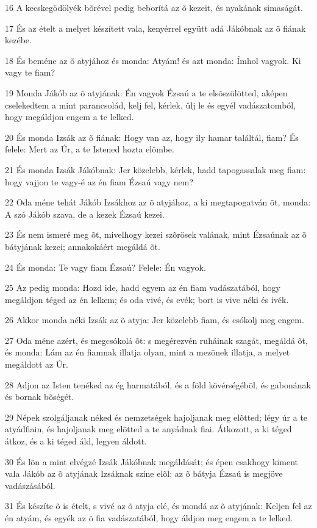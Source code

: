\par 16 A kecskegödölyék bõrével pedig beborítá az õ kezeit, és nyakának simaságát.
\par 17 És az ételt a melyet készített vala, kenyérrel együtt adá Jákóbnak az õ fiának kezébe.
\par 18 És beméne az õ atyjához és monda: Atyám! és azt monda: Ímhol vagyok. Ki vagy te fiam?
\par 19 Monda Jákób az õ atyjának: Én vagyok Ézsaú a te elsõszülötted, aképen cselekedtem a mint parancsolád, kelj fel, kérlek, ûlj le és egyél vadászatomból, hogy megáldjon engem a te lelked.
\par 20 És monda Izsák az õ fiának: Hogy van az, hogy ily hamar találtál, fiam? És felele: Mert az Úr, a te Istened hozta elõmbe.
\par 21 És monda Izsák Jákóbnak: Jer közelebb, kérlek, hadd tapogassalak meg fiam: hogy vajjon te vagy-é az én fiam Ézsaú vagy nem?
\par 22 Oda méne tehát Jákób Izsákhoz az õ atyjához, a ki megtapogatván õt, monda: A szó Jákób szava, de a kezek Ézsaú kezei.
\par 23 És nem ismeré meg õt, mivelhogy kezei szõrösek valának, mint Ézsaúnak az õ bátyjának kezei; annakokáért megáldá õt.
\par 24 És monda: Te vagy fiam Ézsaú? Felele: Én vagyok.
\par 25 Az pedig monda: Hozd ide, hadd egyem az én fiam vadászatából, hogy megáldjon téged az én lelkem; és oda vivé, és evék; bort is vive néki és ivék.
\par 26 Akkor monda néki Izsák az õ atyja: Jer közelebb fiam, és csókolj meg engem.
\par 27 Oda méne azért, és megcsókolá õt: s megérezvén ruháinak szagát, megáldá õt, és monda: Lám az én fiamnak illatja olyan, mint a mezõnek illatja, a melyet megáldott az Úr.
\par 28 Adjon az Isten tenéked az ég harmatából, és a föld kövérségébõl, és gabonának és bornak bõségét.
\par 29 Népek szolgáljanak néked és nemzetségek hajoljanak meg elõtted; légy úr a te atyádfiain, és hajoljanak meg elõtted a te anyádnak fiai. Átkozott, a ki téged átkoz, és a ki téged áld, legyen áldott.
\par 30 És lõn a mint elvégzé Izsák Jákóbnak megáldását; és épen csakhogy kiment vala Jákób az õ atyjának Izsáknak színe elõl; az õ bátyja Ézsaú is megjöve vadászásából.
\par 31 És készíte õ is ételt, s vivé az õ atyja elé, és mondá az õ atyjának: Keljen fel az én atyám, és egyék az õ fia vadászatából, hogy áldjon meg engem a te lelked.
